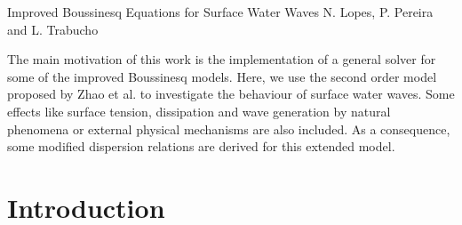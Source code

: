 \def\bu{{\bf u}}
\def\bx{{\bf x}}
\def\fba{\vartheta_1}
\def\fbb{\vartheta_2}
\def\bn{{\bf n}}
\def\bomega{{\bf  \omega}}
\def\dx{{\rm d}x}
\def\dy{{\rm d}y}
\def\dt{{\rm d}t}
\def\ds{{\rm d}s}
\newcommand{\fpar}[2]{\frac{\partial #1}{\partial #2}}
\newcommand{\grad}[1]{\nabla{#1}}
\newcommand{\diverg}[1]{\nabla\cdot{#1}}

              {Improved Boussinesq Equations for Surface Water Waves}
              {N. Lopes, P. Pereira and L. Trabucho}



The main motivation of this work is the implementation of a general
solver for some of the improved Boussinesq models.  Here, we use the second order model proposed by Zhao et al.
\cite{ZhaTen04} to investigate the behaviour of surface water waves.
Some effects like surface tension, dissipation and wave generation by
natural phenomena or external physical mechanisms are also included.
As a consequence, some modified dispersion relations are derived for
this extended model.



\section{Introduction}

